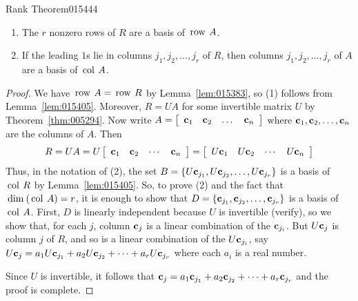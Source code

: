 {{\begin{theorem}{Rank Theorem}{015444}
\begin{enumerate}
\item The $r$ nonzero rows of $R$ are a basis of $\thinspace\operatorname{row\medspace} A$.

\item If the leading $1$s lie in columns $j_{1}, j_{2}, \dots, j_{r}$ of $R$, then columns $j_{1}, j_{2}, \dots, j_{r}$ of $A$ are a basis of $\thinspace\operatorname{col\medspace} A$.

\end{enumerate}
\end{theorem}

\begin{proof}
We have $\thinspace\operatorname{row\medspace} A = \thinspace\operatorname{row\medspace} R$ by Lemma~\ref{lem:015383}, so (1) follows from Lemma~\ref{lem:015405}. Moreover, $R = UA$ for some invertible matrix $U$ by Theorem~\ref{thm:005294}. Now write $A =
\left[ \begin{array}{cccc}
\textbf{c}_1 & \textbf{c}_2 & \dots & \textbf{c}_n
\end{array} \right]$ where $\textbf{c}_{1}, \textbf{c}_{2}, \dots, \textbf{c}_{n}$ are the columns of $A$. Then
\begin{equation*}
R = UA = U
\left[ \begin{array}{cccc}
	\textbf{c}_1 & \textbf{c}_2 & \cdots & \textbf{c}_n
\end{array} \right]
= 
\left[ \begin{array}{cccc}
	U\textbf{c}_1 & U\textbf{c}_2 & \cdots & U\textbf{c}_n
\end{array} \right]
\end{equation*}
Thus, in the notation of (2), the set $B = \{U\textbf{c}_{j_{1}}, U\textbf{c}_{j_{2}}, \dots, U\textbf{c}_{j_{r}}\}$ is a basis of $\thinspace\operatorname{col\medspace} R$ by Lemma~\ref{lem:015405}. So, to prove (2) and the fact that $\thinspace\operatorname{dim\medspace}(\thinspace\operatorname{col\medspace} A) = r$, it is enough to show that $D = \{\textbf{c}_{j_{1}}, \textbf{c}_{j_{2}}, \dots, \textbf{c}_{j_{r}}\}$ is a basis of $\thinspace\operatorname{col\medspace} A$. First, $D$ is linearly independent because $U$ is invertible (verify), so we show that, for each $j$, column $\textbf{c}_{j}$ is a linear combination of the $\textbf{c}_{j_{i}}$. But $U\textbf{c}_{j}$ is column $j$ of $R$, and so is a linear combination of the $U\textbf{c}_{j_{i}}$, say $U\textbf{c}_{j} = a_{1}U\textbf{c}_{j_{1}} + a_{2}U\textbf{c}_{j_{2}} + \dots + a_{r}U\textbf{c}_{j_{r}}$ where each $a_{i}$ is a real number.

Since $U$ is invertible, it follows that
$\textbf{c}_{j} =
a_{1}\textbf{c}_{j_{1}} +
a_{2}\textbf{c}_{j_{2}} +
\dots +
a_{r}\textbf{c}_{j_{r}}$ and the proof is complete.
\end{proof}

}}
